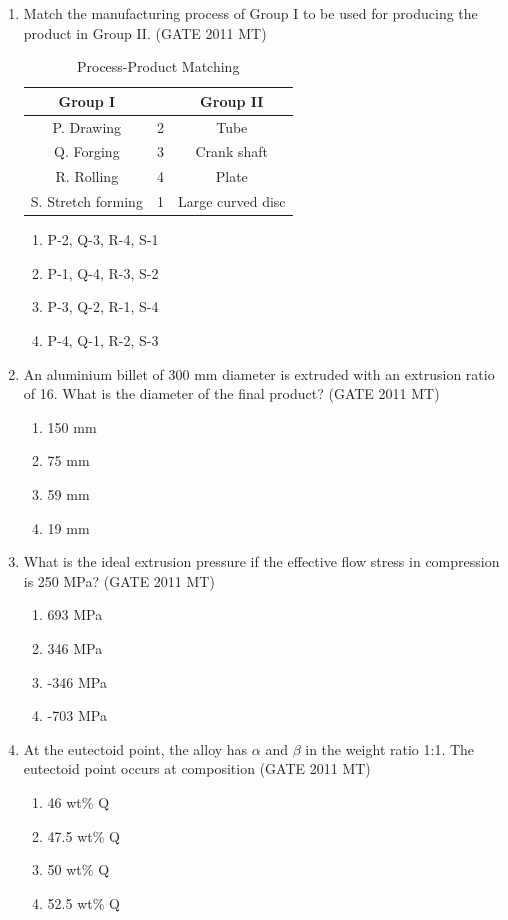 \documentclass[12pt]{article}
\begin{document}
\begin{enumerate}
\item Match the manufacturing process of Group I to be used for producing the product in Group II. (GATE 2011 MT)
\begin{table}[h]
\centering
\caption{Process-Product Matching}
\begin{tabular}{|c|c|c|}
\hline
\textbf{Group I} & & \textbf{Group II} \\
\hline
P. Drawing & 2 & Tube \\
Q. Forging & 3 & Crank shaft \\
R. Rolling & 4 & Plate \\
S. Stretch forming & 1 & Large curved disc \\
\hline
\end{tabular}
\end{table}
\begin{enumerate}[label=(\Alph*)]
    \item P-2, Q-3, R-4, S-1
    \item P-1, Q-4, R-3, S-2
    \item P-3, Q-2, R-1, S-4
    \item P-4, Q-1, R-2, S-3
\end{enumerate}



\item An aluminium billet of 300 mm diameter is extruded with an extrusion ratio of 16. What is the diameter of the final product? (GATE 2011 MT)
    \begin{enumerate}
        \item 150 mm
        \item 75 mm
        \item 59 mm
        \item 19 mm
    \end{enumerate}

\item What is the ideal extrusion pressure if the effective flow stress in compression is 250 MPa? (GATE 2011 MT)
    \begin{enumerate}
        \item 693 MPa
        \item 346 MPa
        \item -346 MPa
        \item -703 MPa
    \end{enumerate}

\item At the eutectoid point, the alloy has $\alpha$ and $\beta$ in the weight ratio 1:1. The eutectoid point occurs at composition (GATE 2011 MT)
    \begin{enumerate}
        \item 46 wt\% Q
        \item 47.5 wt\% Q
        \item 50 wt\% Q
        \item 52.5 wt\% Q
    \end{enumerate}


\end{enumerate}
\end{document}
